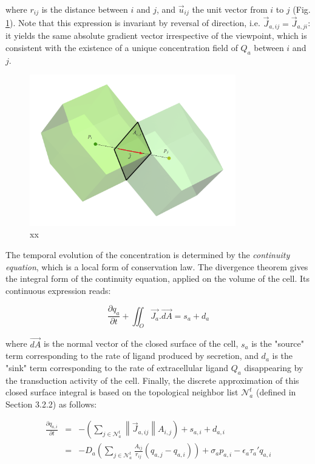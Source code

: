 where $r_{ij}$ is the distance between $i$ and $j$, and $\vec{u}_{ij}$ the unit vector from $i$ to $j$ (Fig. \ref{model_grns_diffusion_schematic}). Note that this expression is invariant by reversal of direction, i.e. $\vec{J}_{a,ij} = \vec{J}_{a,ji}$: it yields the same absolute gradient vector irrespective of the viewpoint, which is consistent with the existence of a unique concentration field of $Q_a$ between $i$ and $j$.
\begin{figure}
\begin{center}
\includegraphics[width=0.8\textwidth]{../../images/model_grns/diffuse_volume_augmented_crop.png}
\end{center}
\caption{xx}
\label{model_grns_diffusion_schematic}
\end{figure}

The temporal evolution of the concentration is determined by the \textit{continuity equation}, which is a local form of conservation law. The divergence theorem gives the integral form of the continuity equation, applied on the volume of the cell. Its continuous expression reads:

$$\frac{\partial q_a}{\partial t} +  \iint_O \vec{J_a}.\vec{dA} = s_a + d_a $$

where $\vec{dA}$ is the normal vector of the closed surface of the cell, $s_a$ is the "source" term corresponding to the rate of ligand produced by secretion, and $d_a$ is the "sink" term corresponding to the rate of extracellular ligand $Q_a$ disappearing by the transduction activity of the cell. Finally, the discrete approximation of this closed surface integral is based on the topological neighbor list $\mathcal{N}^t_a$ (defined in Section 3.2.2) as follows:

$$\begin{eqnarray}        \frac{\partial q_{a,i}}{\partial t} & = & -\left(\sum_{j \in \mathcal{N}^t_a} \left\|\vec{J}_{a,ij}\right\| A_{i,j}\right) + s_{a,i} + d_{a,i} \\                & = & -D_a \left(\sum_{j \in \mathcal{N}^t_a} \frac{A_{ij}}{r_{ij}}(q_{a,j} - q_{a,i})\right) + \sigma_a p_{a,i} - \epsilon_a \tau_a' q_{a,i}      \end{eqnarray}$$


